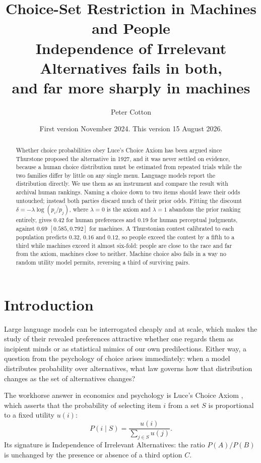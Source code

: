 \documentclass[11pt]{article}
\title{\textbf{Choice-Set Restriction in Machines and People}\\[4pt]
\large\normalfont Independence of Irrelevant Alternatives fails in both,\\
and far more sharply in machines}
\author{Peter Cotton}
\date{First version November 2024. This version 15 August 2026.}
\begin{document}
\maketitle

\begin{abstract}
\noindent Whether choice probabilities obey Luce's Choice Axiom has been argued
since Thurstone proposed the alternative in 1927, and it was never settled on
evidence, because a human choice distribution must be estimated from repeated
trials while the two families differ by little on any single menu. Language
models report the distribution directly. We use them as an instrument and
compare the result with archival human rankings. Naming a choice down to two
items should leave their odds untouched; instead both parties discard much of
their prior odds. Fitting the discount $\delta = -\lambda \log(p_i/p_j)$, where
$\lambda = 0$ is the axiom and $\lambda = 1$ abandons the prior ranking
entirely, gives $0.42$ for human preferences and $0.19$ for human perceptual judgments,
against $0.69$ $[0.585, 0.792]$ for machines. A Thurstonian contest calibrated to
each population predicts $0.32$, $0.16$ and $0.12$, so people exceed the contest
by a fifth to a third while machines exceed it almost six-fold: people are close
to the race and far from the axiom, machines close to neither. Machine choice also fails in a way no random utility
model permits, reversing a third of surviving pairs.
\end{abstract}

\section{Introduction}

Large language models can be interrogated cheaply and at scale, which makes
the study of their revealed preferences attractive whether one regards them
as incipient minds or as statistical mimics of our own predilections.
Either way, a question from the psychology of choice arises immediately:
when a model distributes probability over alternatives, what law governs
how that distribution changes as the set of alternatives changes?

The workhorse answer in economics and psychology is Luce's Choice Axiom
\cite{luce1959}, which asserts that the probability of selecting item $i$
from a set $S$ is proportional to a fixed utility $u(i)$:
\begin{equation}
P(i \mid S) = \frac{u(i)}{\sum_{j \in S} u(j)}.
\label{eq:luce}
\end{equation}
Its signature is Independence of Irrelevant Alternatives: the ratio
$P(A)/P(B)$ is unchanged by the presence or absence of a third option $C$.
\end{document}
